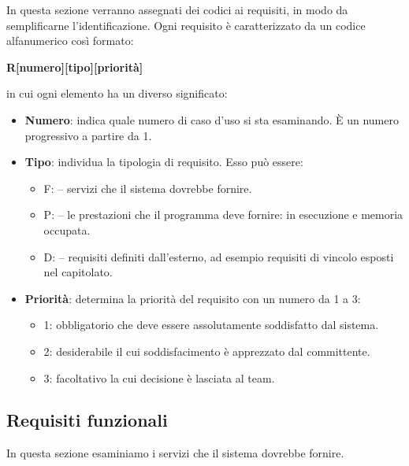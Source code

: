 \documentclass[../analisi-dei-requisiti]{subfiles}
\begin{document}
In questa sezione verranno assegnati dei codici ai requisiti, in modo da semplificarne l’identificazione.
Ogni requisito è caratterizzato da un codice alfanumerico così formato:
\begin{center}
  \textbf{R[numero][tipo][priorità]}
\end{center}
in cui ogni elemento ha un diverso significato:
\begin{itemize}
  \item \textbf{Numero}: indica quale numero di caso d'uso si sta esaminando. È un numero progressivo a partire da 1.
  \item \textbf{Tipo}: individua la tipologia di requisito. Esso può essere:
        \begin{itemize}
          \item F: \@funzionale -- \@indica servizi che il sistema dovrebbe fornire.
          \item P: \@prestazionale -- \@indica le prestazioni che il programma deve fornire:  in esecuzione e memoria occupata.
          \item D: \@dichiarativo -- \@indica requisiti definiti dall'esterno, ad esempio requisiti di vincolo esposti nel capitolato.
        \end{itemize}
  \item \textbf{Priorità}: determina la priorità del requisito con un numero da 1 a 3:
        \begin{itemize}
          \item 1: \@requisito obbligatorio che deve essere assolutamente soddisfatto dal sistema.
          \item 2: \@requisito desiderabile il cui soddisfacimento è apprezzato dal committente.
          \item 3: \@requisito facoltativo la cui decisione è lasciata al team.
        \end{itemize}
\end{itemize}


\subsection{Requisiti funzionali}%
\label{sub:requisiti_funzionali}
In questa sezione esaminiamo i servizi che il sistema dovrebbe fornire.
\end{document}
